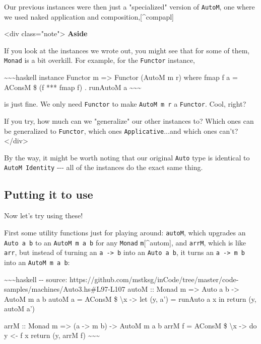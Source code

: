 \documentclass[]{article}
\begin{document}
Our previous instances were then just a "specialized" version of \texttt{AutoM},
one where we used naked application and composition,{[}\^{}compapl{]}

\textless{}div class="note"\textgreater{} \textbf{Aside}

If you look at the instances we wrote out, you might see that for some of them,
\texttt{Monad} is a bit overkill. For example, for the \texttt{Functor}
instance,

\textasciitilde{}\textasciitilde{}\textasciitilde{}haskell instance Functor m
=\textgreater{} Functor (AutoM m r) where fmap f a = AConsM \$ (f *** fmap f) .
runAutoM a \textasciitilde{}\textasciitilde{}\textasciitilde{}

is just fine. We only need \texttt{Functor} to make \texttt{AutoM\ m\ r} a
\texttt{Functor}. Cool, right?

If you try, how much can we "generalize" our other instances to? Which ones can
be generalized to \texttt{Functor}, which ones \texttt{Applicative}...and which
ones can't? \textless{}/div\textgreater{}

By the way, it might be worth noting that our original \texttt{Auto} type is
identical to \texttt{AutoM\ Identity} -\/-\/- all of the instances do the exact
same thing.

\subsection{Putting it to use}

Now let's try using these!

First some utility functions just for playing around: \texttt{autoM}, which
upgrades an \texttt{Auto\ a\ b} to an \texttt{AutoM\ m\ a\ b} for any
\texttt{Monad} \texttt{m}{[}\^{}autom{]}, and \texttt{arrM}, which is like
\texttt{arr}, but instead of turning an \texttt{a\ -\textgreater{}\ b} into an
\texttt{Auto\ a\ b}, it turns an \texttt{a\ -\textgreater{}\ m\ b} into an
\texttt{AutoM\ m\ a\ b}:

\textasciitilde{}\textasciitilde{}\textasciitilde{}haskell -\/- source:
https://github.com/mstksg/inCode/tree/master/code-samples/machines/Auto3.hs\#L97-L107
autoM :: Monad m =\textgreater{} Auto a b -\textgreater{} AutoM m a b autoM a =
AConsM \$ \textbackslash{}x -\textgreater{} let (y, a') = runAuto a x in return
(y, autoM a')

arrM :: Monad m =\textgreater{} (a -\textgreater{} m b) -\textgreater{} AutoM m
a b arrM f = AConsM \$ \textbackslash{}x -\textgreater{} do y \textless{}- f x
return (y, arrM f) \textasciitilde{}\textasciitilde{}\textasciitilde{}
\end{document}
